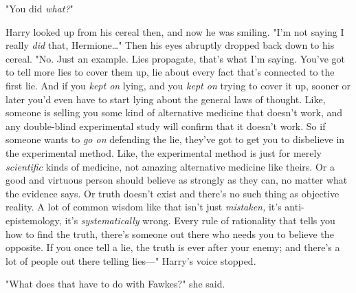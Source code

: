 "You did \emph{what?}"

Harry looked up from his cereal then, and now he was smiling. "I'm not saying I
really \emph{did} that, Hermione{\ldots}" Then his eyes abruptly dropped back
down to his cereal. "No. Just an example. Lies propagate, that's what I'm
saying. You've got to tell more lies to cover them up, lie about every fact
that's connected to the first lie. And if you \emph{kept on} lying, and you
\emph{kept on} trying to cover it up, sooner or later you'd even have to start
lying about the general laws of thought. Like, someone is selling you some kind
of alternative medicine that doesn't work, and any double-blind experimental
study will confirm that it doesn't work. So if someone wants to \emph{go on}
defending the lie, they've got to get you to disbelieve in the experimental
method. Like, the experimental method is just for merely \emph{scientific}
kinds of medicine, not amazing alternative medicine like theirs. Or a good and
virtuous person should believe as strongly as they can, no matter what the
evidence says. Or truth doesn't exist and there's no such thing as objective
reality. A lot of common wisdom like that isn't just \emph{mistaken,} it's
anti-epistemology, it's \emph{systematically} wrong. Every rule of rationality
that tells you how to find the truth, there's someone out there who needs you
to believe the opposite. If you once tell a lie, the truth is ever after your
enemy; and there's a lot of people out there telling lies---" Harry's voice
stopped.

"What does that have to do with Fawkes?" she said.

